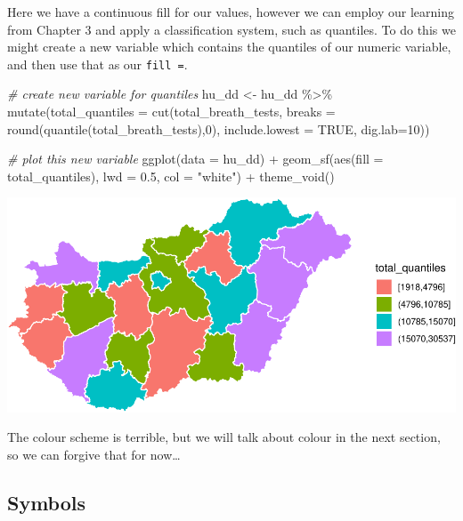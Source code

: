\documentclass[
]{book}
\makeatletter
\newenvironment{Shaded}{\begin{snugshade}}{\end{snugshade}}
\newcommand{\AttributeTok}[1]{\textcolor[rgb]{0.61,0.61,0.61}{#1}}
\newcommand{\CommentTok}[1]{\textcolor[rgb]{0.37,0.37,0.37}{\textit{#1}}}
\newcommand{\ConstantTok}[1]{\textcolor[rgb]{0,0,0}{#1}}
\newcommand{\DecValTok}[1]{\textcolor[rgb]{0.06,0.06,0.06}{#1}}
\newcommand{\FloatTok}[1]{\textcolor[rgb]{0.06,0.06,0.06}{#1}}
\newcommand{\FunctionTok}[1]{\textcolor[rgb]{0,0,0}{#1}}
\newcommand{\NormalTok}[1]{#1}
\newcommand{\OtherTok}[1]{\textcolor[rgb]{0.37,0.37,0.37}{#1}}
\newcommand{\SpecialCharTok}[1]{\textcolor[rgb]{0,0,0}{#1}}
\newcommand{\StringTok}[1]{\textcolor[rgb]{0.5,0.5,0.5}{#1}}
\newenvironment{kframe}{%
\medskip{}
\setlength{\fboxsep}{.8em}
 \def\at@end@of@kframe{}%
 \ifinner\ifhmode%
  \def\at@end@of@kframe{\end{minipage}}%
  \begin{minipage}{\columnwidth}%
 \fi\fi%
 \def\FrameCommand##1{\hskip\@totalleftmargin \hskip-\fboxsep
 \colorbox{shadecolor}{##1}\hskip-\fboxsep
     \hskip-\linewidth \hskip-\@totalleftmargin \hskip\columnwidth}%
 \MakeFramed {\advance\hsize-\width
   \@totalleftmargin\z@ \linewidth\hsize
   \@setminipage}}%
 {\par\unskip\endMakeFramed%
 \at@end@of@kframe}
\renewenvironment{Shaded}{\begin{kframe}}{\end{kframe}}
\makeatother
\begin{document}
Here we have a continuous fill for our values, however we can employ our learning from Chapter 3 and apply a classification system, such as quantiles. To do this we might create a new variable which contains the quantiles of our numeric variable, and then use that as our \texttt{fill\ =}.

\begin{Shaded}
\begin{Highlighting}[]
\CommentTok{\# create new variable for quantiles}
\NormalTok{hu\_dd }\OtherTok{\textless{}{-}}\NormalTok{ hu\_dd }\SpecialCharTok{\%\textgreater{}\%} 
  \FunctionTok{mutate}\NormalTok{(}\AttributeTok{total\_quantiles =} \FunctionTok{cut}\NormalTok{(total\_breath\_tests, }\AttributeTok{breaks =} \FunctionTok{round}\NormalTok{(}\FunctionTok{quantile}\NormalTok{(total\_breath\_tests),}\DecValTok{0}\NormalTok{), }\AttributeTok{include.lowest =} \ConstantTok{TRUE}\NormalTok{, }\AttributeTok{dig.lab=}\DecValTok{10}\NormalTok{))}

\CommentTok{\# plot this new variable}
\FunctionTok{ggplot}\NormalTok{(}\AttributeTok{data =}\NormalTok{ hu\_dd) }\SpecialCharTok{+} 
  \FunctionTok{geom\_sf}\NormalTok{(}\FunctionTok{aes}\NormalTok{(}\AttributeTok{fill =}\NormalTok{ total\_quantiles), }
          \AttributeTok{lwd =} \FloatTok{0.5}\NormalTok{, }
          \AttributeTok{col =} \StringTok{"white"}\NormalTok{) }\SpecialCharTok{+} 
  \FunctionTok{theme\_void}\NormalTok{()}
\end{Highlighting}
\end{Shaded}

\includegraphics{crime_mapping_files/figure-latex/unnamed-chunk-153-1.pdf}

The colour scheme is terrible, but we will talk about colour in the next section, so we can forgive that for now\ldots{}

\hypertarget{symbols}{%
\subsection{Symbols}\label{symbols}}
\end{document}
